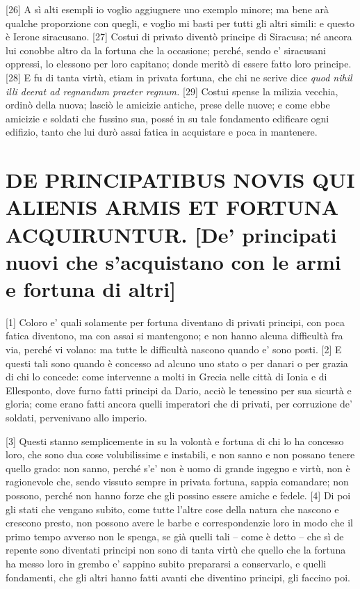 {[}26{]} A sì alti esempli io voglio aggiugnere uno exemplo minore; ma
bene arà qualche proporzione con quegli, e voglio mi basti per tutti gli
altri simili: e questo è Ierone siracusano. {[}27{]} Costui di privato
diventò principe di Siracusa; né ancora lui conobbe altro da la fortuna
che la occasione; perché, sendo e' siracusani oppressi, lo elessono per
loro capitano; donde meritò di essere fatto loro principe. {[}28{]} E fu
di tanta virtù, etiam in privata fortuna, che chi ne scrive dice
\emph{quod nihil illi deerat ad regnandum praeter regnum.} {[}29{]}
Costui spense la milizia vecchia, ordinò della nuova; lasciò le amicizie
antiche, prese delle nuove; e come ebbe amicizie e soldati che fussino
sua, possé in su tale fondamento edificare ogni edifizio, tanto che lui
durò assai fatica in acquistare e poca in mantenere.

\quebra\section{DE PRINCIPATIBUS NOVIS QUI ALIENIS ARMIS ET FORTUNA ACQUIRUNTUR.
{[}De' principati nuovi che s'acquistano con le armi e fortuna di altri{]}}

{[}1{]} Coloro e' quali solamente per fortuna diventano di privati
principi, con poca fatica diventono, ma con assai si mantengono; e non
hanno alcuna difficultà fra via, perché vi volano: ma tutte le
difficultà nascono quando e' sono posti. {[}2{]} E questi tali sono
quando è concesso ad alcuno uno stato o per danari o per grazia di chi
lo concede: come intervenne a molti in Grecia nelle città di Ionia e di
Ellesponto, dove furno fatti principi da Dario, acciò le tenessino per
sua sicurtà e gloria; come erano fatti ancora quelli imperatori che di
privati, per corruzione de' soldati, pervenivano allo imperio.

{[}3{]} Questi stanno semplicemente in su la volontà e fortuna di chi lo
ha concesso loro, che sono dua cose volubilissime e instabili, e non
sanno e non possano tenere quello grado: non sanno, perché s'e' non è
uomo di grande ingegno e virtù, non è ragionevole che, sendo vissuto
sempre in privata fortuna, sappia comandare; non possono, perché non
hanno forze che gli possino essere amiche e fedele. {[}4{]} Di poi gli
stati che vengano subito, come tutte l'altre cose della natura che
nascono e crescono presto, non possono avere le barbe e correspondenzie
loro in modo che il primo tempo avverso non le spenga, se già quelli
tali -- come è detto -- che sì de repente sono diventati principi non
sono di tanta virtù che quello che la fortuna ha messo loro in grembo e'
sappino subito prepararsi a conservarlo, e quelli fondamenti, che gli
altri hanno fatti avanti che diventino principi, gli faccino poi.

